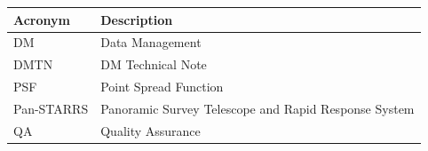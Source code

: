 \addtocounter{table}{-1}
\begin{longtable}{p{}p{}}\hline
\textbf{Acronym} & \textbf{Description}  \\\hline

DM & Data Management \\\hline
DMTN & DM Technical Note \\\hline
PSF & Point Spread Function \\\hline
Pan-STARRS & Panoramic Survey Telescope and Rapid Response System \\\hline
QA & Quality Assurance \\\hline
\end{longtable}
